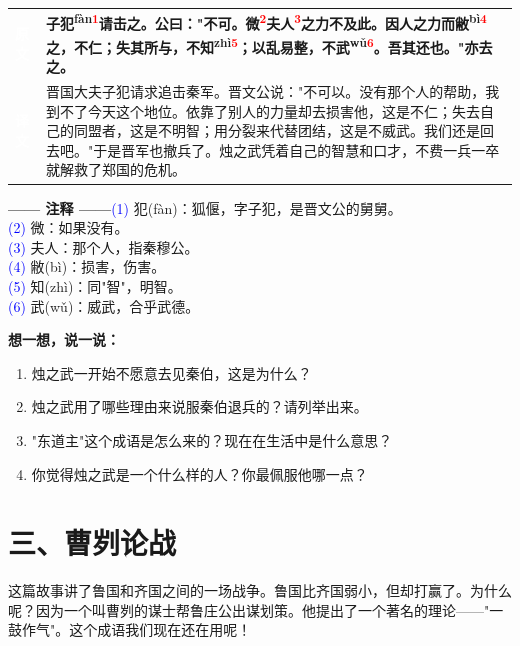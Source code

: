 \documentclass[a4paper,12pt]{ctexart}
\makeatletter
\newcommand{\ruby}[2]{#1\textsuperscript{#2}}
\newlength{\colA}\setlength{\colA}{0.06\textwidth}
\newlength{\colB}\setlength{\colB}{0.64\textwidth}
\newlength{\colC}\setlength{\colC}{0.26\textwidth}
\newcommand{\sectab}[3]{%
  \noindent
  \begin{minipage}[c]{\dimexpr\colA+\colB+2\tabcolsep\relax}
  \begin{tabular}{@{}p{\colA}p{\colB}@{}}
  \sideyuan  & {\large\bfseries #1} \\
  \sideyiwen & {\large #2} \\
  \end{tabular}
  \end{minipage}
  \hfill
  \begin{minipage}[c]{\colC}
  {\labelann\vspace{0.1cm}}#3
  \end{minipage}
  \par
}
\newcommand{\sideyuan}{\colorbox{blue!70!black}{\textcolor{white}{\normalsize\textbf{原文}}}}
\newcommand{\sideyiwen}{\colorbox{green!60!black}{\textcolor{white}{\normalsize\textbf{译文}}}}
\newcommand{\labelann}{\textcolor{orange!80!black}{\small\textbf{—— 注释 ——}}}
\newcommand{\refmark}[1]{\textsuperscript{\textcolor{red}{#1}}}
\makeatother
\begin{document}
\vspace{0.3cm}
\sectab{子\ruby{犯}{fàn}\refmark{1}请击之。公曰："不可。微\refmark{2}夫人\refmark{3}之力不及此。因人之力而\ruby{敝}{bì}\refmark{4}之，不仁；失其所与，不\ruby{知}{zhì}\refmark{5}；以乱易整，不\ruby{武}{wǔ}\refmark{6}。吾其还也。"亦去之。}{晋国大夫子犯请求追击秦军。晋文公说："不可以。没有那个人的帮助，我到不了今天这个地位。依靠了别人的力量却去损害他，这是不仁；失去自己的同盟者，这是不明智；用分裂来代替团结，这是不威武。我们还是回去吧。"于是晋军也撤兵了。烛之武凭着自己的智慧和口才，不费一兵一卒就解救了郑国的危机。}{{\small \textcolor{blue}{(1)} 犯(fàn)：狐偃，字子犯，是晋文公的舅舅。}\\[0.1cm]{\small \textcolor{blue}{(2)} 微：如果没有。}\\[0.1cm]{\small \textcolor{blue}{(3)} 夫人：那个人，指秦穆公。}\\[0.1cm]{\small \textcolor{blue}{(4)} 敝(bì)：损害，伤害。}\\[0.1cm]{\small \textcolor{blue}{(5)} 知(zhì)：同"智"，明智。}\\[0.1cm]{\small \textcolor{blue}{(6)} 武(wǔ)：威武，合乎武德。}}

\vspace{0.3cm}
{\large\textcolor{orange!80!black}{\textbf{想一想，说一说：}}}
\begin{enumerate}
  \item 烛之武一开始不愿意去见秦伯，这是为什么？
  \item 烛之武用了哪些理由来说服秦伯退兵的？请列举出来。
  \item "东道主"这个成语是怎么来的？现在在生活中是什么意思？
  \item 你觉得烛之武是一个什么样的人？你最佩服他哪一点？
\end{enumerate}

\newpage

\section*{\textcolor{orange!80!black}{三、曹刿论战}}

这篇故事讲了鲁国和齐国之间的一场战争。鲁国比齐国弱小，但却打赢了。为什么呢？因为一个叫曹刿的谋士帮鲁庄公出谋划策。他提出了一个著名的理论——"一鼓作气"。这个成语我们现在还在用呢！
\end{document}
